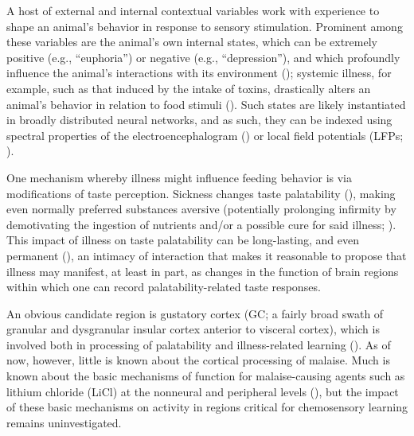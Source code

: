 \begin{refsection}
A host of external and internal contextual variables work with experience to shape an animal’s behavior in response to sensory stimulation. Prominent among these variables are the animal’s own internal states, which can be extremely positive (e.g., “euphoria”) or negative (e.g., “depression”), and which profoundly influence the animal’s interactions with its environment (\cite{livneh2020a}); systemic illness, for example, such as that induced by the intake of toxins, drastically alters an animal’s behavior in relation to food stimuli (\cite{parker1982a,nachman1963a,nachman1973a}). Such states are likely instantiated in broadly distributed neural networks, and as such, they can be indexed using spectral properties of the electroencephalogram (\cite{loefhede2010a,li-a}) or local field potentials (LFPs; \cite{okonogi2018a,kelly2010a}).

One mechanism whereby illness might influence feeding behavior is via modifications of taste perception. Sickness changes taste palatability (\cite{aubert1999a,aubert2005a}), making even normally preferred substances aversive (potentially prolonging infirmity by demotivating the ingestion of nutrients and/or a possible cure for said illness; \cite{provenza1995a}). This impact of illness on taste palatability can be long-lasting, and even permanent (\cite{garcia1974a}), an intimacy of interaction that makes it reasonable to propose that illness may manifest, at least in part, as changes in the function of brain regions within which one can record palatability-related taste responses.

An obvious candidate region is gustatory cortex (GC; a fairly broad swath of granular and dysgranular insular cortex anterior to visceral cortex), which is involved both in processing of palatability and illness-related learning (\cite{flores2018a,lin2014a}). As of now, however, little is known about the cortical processing of malaise. Much is known about the basic mechanisms of function for malaise-causing agents such as lithium chloride (LiCl) at the nonneural and peripheral levels (\cite{parker1982a,nachman1963a,nachman1973a,cloutier2012a,cloutier2012b,cloutier2017a,zhang2021a,nachman1975a}), but the impact of these basic mechanisms on activity in regions critical for chemosensory learning remains uninvestigated.


\end{refsection}
